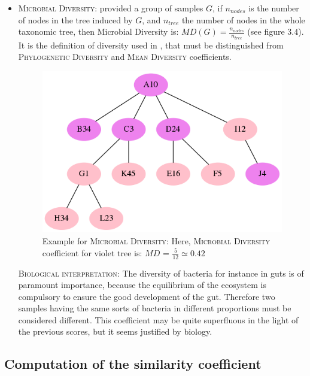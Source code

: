 \documentclass{report}
\begin{document}
\begin{itemize}
\item \textsc{Microbial Diversity:} provided a group of samples $G$, if $n_{nodes}$ is the number of nodes in the tree induced by $G$, and $n_{tree}$ the number of nodes in the whole taxonomic tree, then Microbial Diversity is: $MD(G) = \frac{n_{nodes}}{n_{tree}}$ (see figure $3.4$). It is the definition of diversity used in \cite{Enaud}, that must be distinguished from \textsc{Phylogenetic Diversity} \cite{PhyloD} and \textsc{Mean Diversity} \cite{MeanD} coefficients.

\begin{figure}[H]
\centering
\includegraphics[scale=0.5]{illustrations/diversity.png}
\caption{Example for \textsc{Microbial Diversity}: Here, \textsc{Microbial Diversity} coefficient for violet tree is: $MD$ = $\frac{5}{12} \simeq 0.42$}
\end{figure}

\bigskip

\textsc{Biological interpretation:} The diversity of bacteria for instance in guts is of paramount importance, because the equilibrium of the ecosystem is compulsory to ensure the good development of the gut. Therefore two samples having the same sorts of bacteria in different proportions must be considered different. This coefficient may be quite superfluous in the light of the previous scores, but it seems justified by biology.

\end{itemize}

\subsection{Computation of the similarity coefficient}
\end{document}
